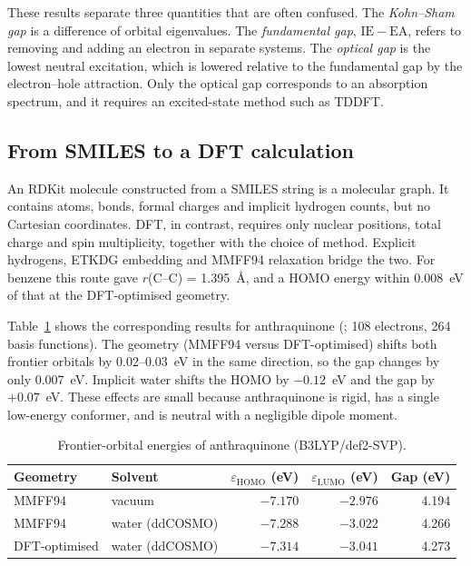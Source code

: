 \documentclass[11pt,a4paper]{article}
\begin{document}
These results separate three quantities that are often confused. The \emph{Kohn--Sham gap} is a
difference of orbital eigenvalues. The \emph{fundamental gap}, $\mathrm{IE}-\mathrm{EA}$, refers to
removing and adding an electron in separate systems. The \emph{optical gap} is the lowest neutral
excitation, which is lowered relative to the fundamental gap by the electron--hole attraction.
Only the optical gap corresponds to an absorption spectrum, and it requires an excited-state method
such as TDDFT.

\subsection{From SMILES to a DFT calculation}

An RDKit molecule constructed from a SMILES string is a molecular graph. It contains atoms, bonds,
formal charges and implicit hydrogen counts, but no Cartesian coordinates. DFT, in contrast,
requires only nuclear positions, total charge and spin multiplicity, together with the choice of
method. Explicit hydrogens, ETKDG embedding and MMFF94 relaxation bridge the two.
For benzene this route gave $r$(C--C) = 1.395~\AA, and a HOMO energy within 0.008~eV of that at the
DFT-optimised geometry.

Table~\ref{tab:aq} shows the corresponding results for anthraquinone (; 108 electrons,
264 basis functions). The geometry (MMFF94 versus DFT-optimised) shifts both frontier orbitals by
0.02--0.03~eV in the same direction, so the gap changes by only 0.007~eV. Implicit water shifts the
HOMO by $-0.12$~eV and the gap by $+0.07$~eV. These effects are small because anthraquinone is
rigid, has a single low-energy conformer, and is neutral with a negligible dipole moment.

\begin{table}[h]
\centering\small
\caption{Frontier-orbital energies of anthraquinone (B3LYP/def2-SVP).}
\label{tab:aq}
\begin{tabular}{@{}llrrr@{}}
\toprule
Geometry & Solvent & $\varepsilon_\text{HOMO}$ (eV) & $\varepsilon_\text{LUMO}$ (eV) & Gap (eV) \\
\midrule
MMFF94 & vacuum & $-7.170$ & $-2.976$ & 4.194 \\
MMFF94 & water (ddCOSMO) & $-7.288$ & $-3.022$ & 4.266 \\
DFT-optimised & water (ddCOSMO) & $-7.314$ & $-3.041$ & 4.273 \\
\bottomrule
\end{tabular}
\end{table}
\end{document}
